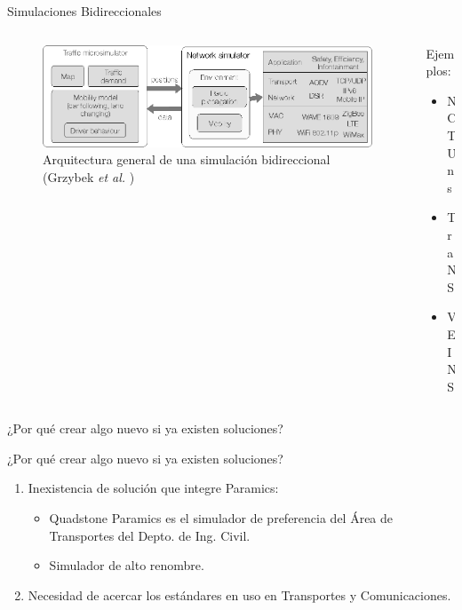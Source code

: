 \documentclass[aspectratio=169]{beamer}
\begin{document}
\begin{frame}{Simulaciones Bidireccionales}
\begin{columns}
    \begin{column}{.75\linewidth}
        \begin{figure}[p]
            \centering
            \includegraphics[width=\textwidth]{figuras/bidirectionalsimul.png}
            \caption{Arquitectura general de una simulación bidireccional\\(Grzybek \emph{et al.} \autocite{trendsvanet2012})}
            \label{fig:bidirsimulation}
        \end{figure}
    \end{column}
    \begin{column}{.25\linewidth}
        Ejemplos:
        \begin{itemize}
            \item NCTUns \autocite{nctuns6}
            \item TraNS \autocite{piorkowski2008trans}
            \item VEINS \autocite{sommer_german_dressler}
        \end{itemize}        
    \end{column}
\end{columns}
\end{frame}

\begin{frame}[standout]
¿Por qué crear algo nuevo si ya existen soluciones?
\end{frame}

\begin{frame}{¿Por qué crear algo nuevo si ya existen soluciones?}
\begin{enumerate}
    \item Inexistencia de solución que integre Paramics:\pause
    \begin{itemize}
        \item Quadstone Paramics es el simulador de preferencia del Área de Transportes del Depto. de Ing. Civil.
        \item Simulador de alto renombre.\pause
    \end{itemize}
    \item Necesidad de acercar los estándares en uso en Transportes y Comunicaciones.

\end{enumerate}
\end{frame}
\end{document}
